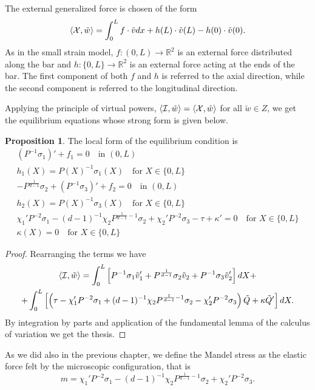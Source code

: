 \documentclass[a4paper,10pt,twoside]{amsbook}
\numberwithin{section}{chapter}
\numberwithin{equation}{chapter}
\theoremstyle{definition}
\newtheorem{prop}{Proposition}[chapter]
\DeclarePairedDelimiter{\dual}{\langle}{\rangle}
\begin{document}
The external generalized force is chosen of the form
\[
\dual{\mathcal X,\tilde w}=\int_0^Lf\cdot\tilde vdx+h(L)\cdot\tilde v(L)-h(0)\cdot\tilde v(0).
\]
As in the small strain model, $f\colon(0,L)\to\mathbb{R}^2$ is an external force distributed along the bar and $h\colon\{0,L\}\to\mathbb{R}^2$ is an external force acting at the ends of the bar. The first component of both $f$ and $h$ is referred to the axial direction, while the second component is referred to the longitudinal direction.

Applying the principle of virtual powers, $\dual{\mathcal{I},\tilde w}=\dual{\mathcal{X},\tilde w}$ for all $\tilde w\in Z$, we get the equilibrium equations whose strong form is given below.
\begin{prop}
The local form of the equilibrium condition is
\begin{subequations}
\label{eqn:indeinite-equation-necking-large}
\begin{gather}
(P^{-1}\sigma_1)'+f_1=0\quad\text{in $(0,L)$} \\
h_1(X)=P(X)^{-1}\sigma_1(X)\quad\text{for $X\in\{0,L\}$} \\
-P^{\frac{1}{d-1}}\sigma_2+(P^{-1}\sigma_3)'+f_2=0\quad\text{in $(0,L)$} \\
h_2(X)=P(X)^{-1}\sigma_3(X)\quad\text{for $X\in\{0,L\}$} \\
\chi_1'P^{-2}\sigma_1-(d-1)^{-1}\chi_2P^{\frac{1}{d-1}-1}\sigma_2+\chi_2'P^{-2}\sigma_3-\tau+\kappa'=0\quad\text{for $X\in\{0,L\}$} \\
\kappa(X)=0\quad\text{for $X\in\{0,L\}$}
\end{gather}
\end{subequations}
\end{prop}
\begin{proof}
Rearranging the terms we have
\begin{multline*}
\dual{\mathcal{I},\tilde w}=\int_0^L\left[P^{-1}\sigma_1\tilde v_1'+P^{\frac{1}{d-1}}\sigma_2\tilde v_2+P^{-1}\sigma_3\tilde v_2'\right]dX+\\
+\int_0^L\left[\left(\tau-\chi_1'P^{-2}\sigma_1+(d-1)^{-1}\chi_2P^{\frac{1}{d-1}-1}\sigma_2-\chi_2'P^{-2}\sigma_3\right)\tilde Q+\kappa\tilde Q'\right]dX.
\end{multline*}
By integration by parts and application of the fundamental lemma of the calculus of variation we get the thesis.
\end{proof}
As we did also in the previous chapter, we define the Mandel stress as the elastic force felt by the microscopic configuration, that is
\begin{equation}
\label{eqn:neck-large-mandel}
m=\chi_1'P^{-2}\sigma_1-(d-1)^{-1}\chi_2P^{\frac{1}{d-1}-1}\sigma_2+\chi_2'P^{-2}\sigma_3.
\end{equation}
\end{document}

